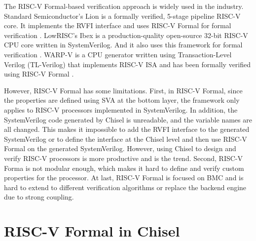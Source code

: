 \documentclass[conference]{IEEEtran}
\theoremstyle{definition}
\begin{document}
The RISC-V Formal-based verification approach is widely used in the industry. 
Standard Semiconductor's Lion is a formally verified, 5-stage pipeline RISC-V core.
It implements the RVFI interface and uses RISC-V Formal for formal verification \cite{lion}.
LowRISC's Ibex is a production-quality open-source 32-bit RISC-V CPU core written in SystemVerilog. And it also uses this framework for formal verification \cite{ibex}.
WARP-V is a CPU generator written using Transaction-Level Verilog (TL-Verilog) that implements RISC-V ISA and has been formally verified using RISC-V Formal \cite{hoover2018formally}.

However, RISC-V Formal has some limitations. 
First, in RISC-V Formal, since the properties are defined using SVA at the bottom layer, the framework only applies to RISC-V processors implemented in SystemVerilog.
In addition, the SystemVerilog code generated by Chisel is unreadable, and the variable names are all changed.
This makes it impossible to add the RVFI interface to the generated SystemVerilog or to define the interface at the Chisel level and then use RISC-V Formal on the generated SystemVerilog.
However, using Chisel to design and verify RISC-V processors is more productive and is the trend.
Second, RISC-V Forma is not modular enough, which makes it hard to define and verify custom properties for the processor.
At last, RISC-V Formal is focused on BMC and is hard to extend to different verification algorithms or replace the backend engine due to strong coupling.

\section{RISC-V Formal in Chisel}
\end{document}
